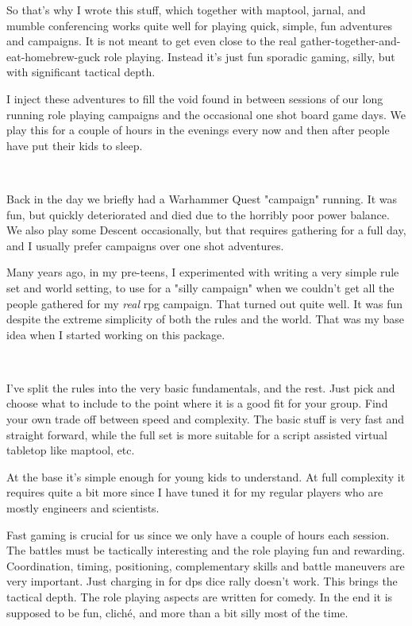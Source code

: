 \documentclass[11pt, twoside, titlepage, a4paper]{report}
\begin{document}
So that's why I wrote this stuff, which together with maptool, jarnal, and mumble conferencing works quite well for playing quick, simple, fun adventures and campaigns. It is not meant to get even close to the real gather-together-and-eat-homebrew-guck role playing. Instead it's just fun sporadic gaming, silly, but with significant tactical depth.

I inject these adventures to fill the void found in between sessions of our long running role playing campaigns and the occasional one shot board game days.
We play this for a couple of hours in the evenings every now and then after people have put their kids to sleep.

\

Back in the day we briefly had a Warhammer Quest "campaign" running. It was fun, but quickly deteriorated and died due to the horribly poor power balance. We also play some Descent occasionally, but that requires gathering for a full day, and I usually prefer campaigns over one shot adventures.

Many years ago, in my pre-teens, I experimented with writing a very simple rule set and world setting, to use for a "silly campaign" when we couldn't get all the people gathered for my \emph{real} rpg campaign. That turned out quite well. It was fun despite the extreme simplicity of both the rules and the world. That was my base idea when I started working on this package.

\

I've split the rules into the very basic fundamentals, and the rest. Just pick and choose what to include to the point where it is a good fit for your group. Find your own trade off between speed and complexity. The basic stuff is very fast and straight forward, while the full set is more suitable for a script assisted virtual tabletop like maptool, etc.

At the base it's simple enough for young kids to understand. At full complexity it requires quite a bit more since I have tuned it for my regular players who are mostly engineers and scientists.

Fast gaming is crucial for us since we only have a couple of hours each session. The battles must be tactically interesting and the role playing fun and rewarding. Coordination, timing, positioning, complementary skills and battle maneuvers are very important. Just charging in for dps dice rally doesn't work. This brings the tactical depth. The role playing aspects are written for comedy. In the end it is supposed to be fun, cliché, and more than a bit silly most of the time.
\end{document}
